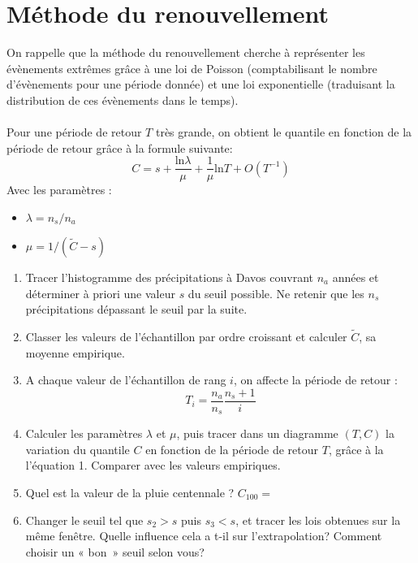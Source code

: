 \documentclass[a4paper]{article}
\begin{document}
\section{Méthode du renouvellement}
On rappelle que la méthode du renouvellement cherche à représenter les évènements extrêmes grâce à une loi de Poisson (comptabilisant le nombre d'évènements pour une période donnée) et une loi exponentielle (traduisant la distribution de ces évènements dans le temps). \\~\\ Pour une période de retour $T$ très grande, on obtient le quantile en fonction de la période de retour grâce à la formule suivante:\\
\begin{equation}\label{renouv}
 C=s+\frac{\mbox{ln}\lambda}{\mu}+\frac{1}{\mu}\mbox{ln}T+O(T^{-1})
\end{equation}
Avec les paramètres :
\begin{itemize}
 \item $\lambda=n_s/n_a$
 \item $\mu=1/(\tilde{C}-s)$
\end{itemize}
\begin{enumerate}
\item Tracer l'histogramme des précipitations à Davos couvrant $n_a$ années et déterminer à priori une valeur $s$ du seuil possible. Ne retenir que les $n_s$ précipitations dépassant le seuil par la suite.
\item Classer les valeurs de l'échantillon par ordre croissant et calculer $\tilde{C}$, sa moyenne empirique.
\item A chaque valeur de l'échantillon de rang $i$, on affecte la période de retour :
\begin{equation}
 T_i=\frac{n_a}{n_s}\frac{n_s+1}{i}
\end{equation}
\item Calculer les paramètres $\lambda$ et $\mu$, puis tracer dans un diagramme $(T,C)$ la variation du quantile $C$ en fonction de la période de retour $T$, grâce à la l'équation 1. Comparer avec les valeurs empiriques.
\item Quel est la valeur de la pluie centennale ? $C_{100}=$
\item Changer le seuil tel que $s_2>s$ puis $s_3<s$, et tracer les lois obtenues sur la même fenêtre. Quelle influence cela a t-il sur l'extrapolation? Comment choisir un « bon~» seuil selon vous?
\end{enumerate}
\end{document}
